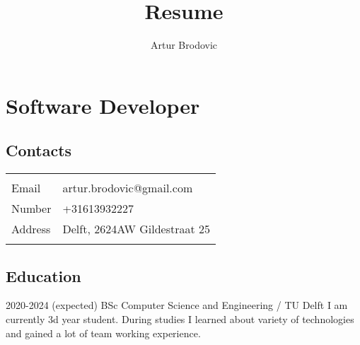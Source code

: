 \documentclass{article}
\begin{document}
\title{Resume}
\author{Artur Brodovic}
\maketitle

\section{Software Developer}
\subsection{Contacts}
\renewcommand{\arraystretch}{1.3}
\vspace{0.5em}
\begin{tabular}{l l}
    \hline \\[-1.0em]
    Email & artur.brodovic@gmail.com \\
    Number & +31613932227 \\
    Address & Delft, 2624AW Gildestraat 25 \\
    \\[-1.0em] \hline 
\end{tabular}
\subsection{Education}
\cvitem
{2020-2024 (expected)}
{BSc Computer Science and Engineering}
{/ TU Delft}
{I am currently 3d year student. During studies I learned about variety of technologies and gained a lot of team working experience.}
\end{document}
